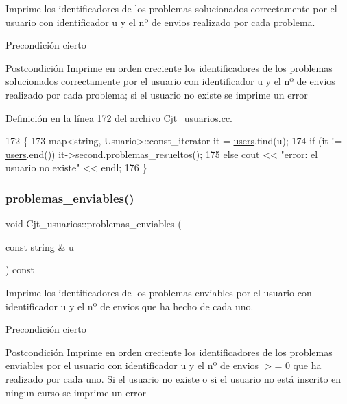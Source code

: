 Imprime los identificadores de los problemas solucionados correctamente por el usuario con identificador u y el nº de envios realizado por cada problema. 

\begin{DoxyPrecond}{Precondición}
cierto 
\end{DoxyPrecond}
\begin{DoxyPostcond}{Postcondición}
Imprime en orden creciente los identificadores de los problemas solucionados correctamente por el usuario con identificador u y el nº de envios realizado por cada problema; si el usuario no existe se imprime un error 
\end{DoxyPostcond}


Definición en la línea 172 del archivo Cjt\+\_\+usuarios.\+cc.


\begin{DoxyCode}
172                                                                   \{
173         map<string, Usuario>::const\_iterator it = \mbox{\hyperlink{class_cjt__usuarios_a0b702ca0184d6fb2674cc827d39d5bff}{users}}.find(u);
174         \textcolor{keywordflow}{if} (it != \mbox{\hyperlink{class_cjt__usuarios_a0b702ca0184d6fb2674cc827d39d5bff}{users}}.end()) it->second.problemas\_resueltos();
175         \textcolor{keywordflow}{else} cout << \textcolor{stringliteral}{"error: el usuario no existe"} << endl;
176       \}
\end{DoxyCode}
\mbox{\label{class_cjt__usuarios_a60b4396cdd65a2aa4b7a8706dabbe08b}} 
\subsubsection{\texorpdfstring{problemas\+\_\+enviables()}{problemas\_enviables()}}
{\footnotesize\ttfamily void Cjt\+\_\+usuarios\+::problemas\+\_\+enviables (\begin{DoxyParamCaption}\item[{const string \&}]{u }\end{DoxyParamCaption}) const}



Imprime los identificadores de los problemas enviables por el usuario con identificador u y el nº de envios que ha hecho de cada uno. 

\begin{DoxyPrecond}{Precondición}
cierto 
\end{DoxyPrecond}
\begin{DoxyPostcond}{Postcondición}
Imprime en orden creciente los identificadores de los problemas enviables por el usuario con identificador u y el nº de envios $>$= 0 que ha realizado por cada uno. Si el usuario no existe o si el usuario no está inscrito en ningun curso se imprime un error 
\end{DoxyPostcond}


